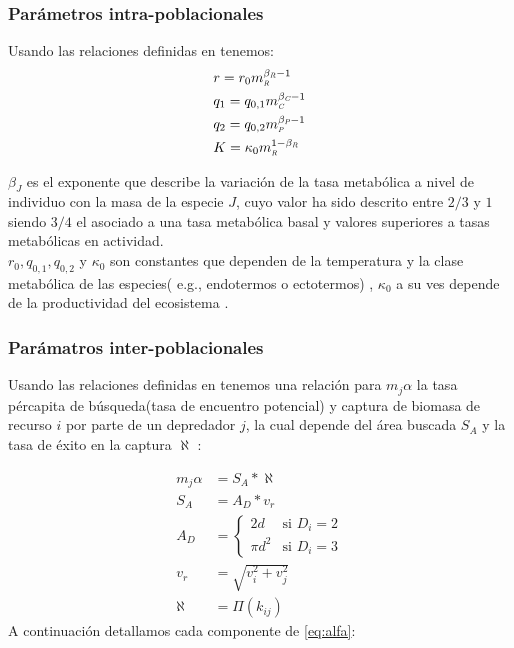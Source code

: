 \subsubsection{Par\'ametros intra-poblacionales}
Usando las relaciones definidas en \cite{savage2004effects} tenemos:
\begin{equation}\label{eq:params3}
\begin{aligned}
&r = r_0m_{\textit{\tiny R}}^{\beta_{\textit{\tiny R}} - 1} \\
&q_1=q_{0,1}m_{\textit{\tiny C}}^{\beta_{\textit{\tiny C}} - 1} \\
&q_2= q_{0,2}m_{\textit{\tiny P}}^{\beta_{\textit{\tiny P}} -1}\\
&K= \kappa_{0}m_{\textit{\tiny R}}^{1-\beta_{\textit{\tiny R}}}
\end{aligned}
\end{equation}

$\beta_J$ es el exponente que describe la variaci\'on de la tasa metab\'olica a nivel de individuo con la masa de la especie $J$, cuyo valor ha sido descrito entre $2/3$ y $1$ siendo $3/4$ el asociado a una tasa metab\'olica basal y valores superiores a tasas metab\'olicas en actividad\citep{pawar2012dimensionality,west1997general,savage2004predominance}. \\
$r_0,q_{0,1},q_{0,2}$ y $\kappa_0$ son constantes que dependen de la temperatura y la clase metab\'olica de las especies( e.g., endotermos o ectotermos) , $\kappa_0$ a su ves depende de la productividad del ecosistema \citep{pawar2012dimensionality}.
\subsubsection{Par\'amatros inter-poblacionales}
Usando las relaciones definidas en \citep{pawar2012dimensionality,kiltie2000scaling,mcgill2006allometric,bejan2006unifying} tenemos una relaci\'on para $m_j\alpha$  la tasa p\'ercapita de b\'usqueda(tasa de encuentro potencial) y captura de biomasa de recurso $i$ por parte de un depredador $j$, la cual depende del \'area buscada $S_A$ y la tasa de \'exito en la captura $\aleph$ : 

\begin{equation}\label{eq:alfa}
\begin{aligned}
 m_j\alpha & =  S_A*\aleph \\
 S_A &=  A_D * v_r \\
A_D &=  \begin{cases} 2d & \text{si } D_i = 2 \\ \pi d^2 & \text{si } D_i = 3 \end{cases}\\
v_r &= \sqrt{v_i^2 +v_j^2}\\
\aleph &= \Pi(k_{ij})
\end{aligned}
\end{equation}
A continuaci\'on detallamos cada componente de \eqref{eq:alfa}:\\

